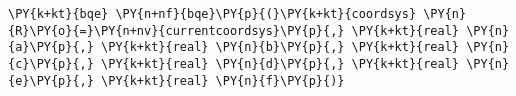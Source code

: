 \begin{Verbatim}[commandchars=\\\{\}]
    \PY{k+kt}{bqe} \PY{n+nf}{bqe}\PY{p}{(}\PY{k+kt}{coordsys} \PY{n}{R}\PY{o}{=}\PY{n+nv}{currentcoordsys}\PY{p}{,} \PY{k+kt}{real} \PY{n}{a}\PY{p}{,} \PY{k+kt}{real} \PY{n}{b}\PY{p}{,} \PY{k+kt}{real} \PY{n}{c}\PY{p}{,} \PY{k+kt}{real} \PY{n}{d}\PY{p}{,} \PY{k+kt}{real} \PY{n}{e}\PY{p}{,} \PY{k+kt}{real} \PY{n}{f}\PY{p}{)}
\end{Verbatim}

